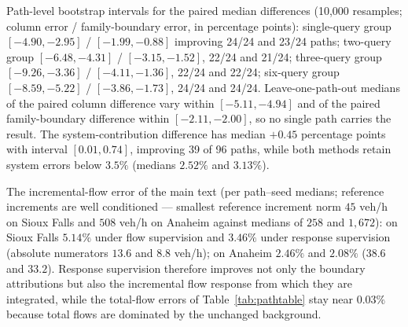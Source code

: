 Path-level bootstrap intervals for the paired median differences
(10,000 resamples; column error / family-boundary error, in percentage
points): single-query group $[-4.90,-2.95]$ / $[-1.99,-0.88]$
improving 24/24 and 23/24 paths; two-query group $[-6.48,-4.31]$ /
$[-3.15,-1.52]$, 22/24 and 21/24; three-query group $[-9.26,-3.36]$ /
$[-4.11,-1.36]$, 22/24 and 22/24; six-query group $[-8.59,-5.22]$ /
$[-3.86,-1.73]$, 24/24 and 24/24. Leave-one-path-out medians of the
paired column difference vary within $[-5.11,-4.94]$ and of the paired
family-boundary difference within $[-2.11,-2.00]$, so no single path
carries the result. The system-contribution difference has median
$+0.45$ percentage points with interval $[0.01,0.74]$, improving 39 of
96 paths, while both methods retain system errors below $3.5\%$
(medians $2.52\%$ and $3.13\%$).

The incremental-flow error of the main text (per path--seed medians;
reference increments are well conditioned --- smallest reference
increment norm $45$ veh/h on Sioux Falls and $508$ veh/h on Anaheim
against medians of $258$ and $1{,}672$): on Sioux Falls
$5.14\%$ under flow supervision and $3.46\%$ under response
supervision (absolute numerators $13.6$ and $8.8$ veh/h); on Anaheim
$2.46\%$ and $2.08\%$ ($38.6$ and $33.2$). Response supervision
therefore improves not only the boundary attributions but also the
incremental flow response from which they are integrated, while the
total-flow errors of Table~\ref{tab:pathtable} stay near $0.03\%$
because total flows are dominated by the unchanged background.

